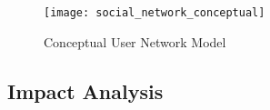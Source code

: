 \begin{figure}[H]
  \centering
  \texttt{[image: social\_network\_conceptual]}
  \caption{Conceptual User Network Model}
  \label{fig:social_network_conceptual}
\end{figure}

\subsection{Impact Analysis}\label{sec:fa_social_network_impact_analysis}
